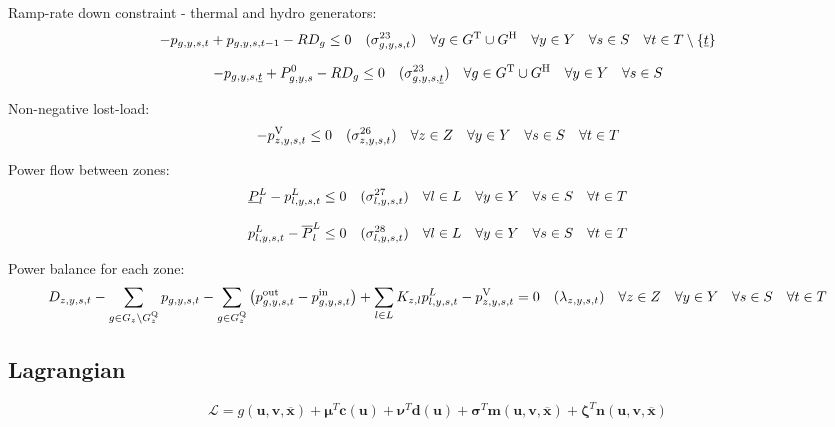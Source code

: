 \documentclass{article}
\newcommand{\sScenarioSets}{\quad \forall \iYear \in \sYears \quad \forall \iScenario \in \sScenarios \quad \forall \iInterval \in \sIntervals}
\begin{document}
Ramp-rate down constraint - thermal and hydro generators:
\begin{equation}
	- \vPower + \vPower[\iGenerator,\iYear,\iScenario,\iInterval-1] - \cRampRateDown \leq 0 \quad (\dRampRateDown) \quad \forall \iGenerator \in \sGeneratorsThermal \cup \sGeneratorsHydro \quad \forall \iYear \in \sYears \quad \forall \iScenario \in \sScenarios \quad \forall \iInterval \in \sIntervals \setminus \{\iIntervalStart\}
\end{equation}

\begin{equation}
- \vPower[\iGenerator,\iYear,\iScenario,\iIntervalStart] + \cPowerInitial - \cRampRateDown \leq 0 \quad (\dRampRateDown[\iGenerator,\iYear,\iScenario,\iIntervalStart]) \quad \forall \iGenerator \in \sGeneratorsThermal \cup \sGeneratorsHydro \quad \forall \iYear \in \sYears \quad \forall \iScenario \in \sScenarios
\end{equation}

Non-negative lost-load:
\begin{equation}
	- \vLostLoadPower \leq 0 \quad (\dNonNegativeLostLoad) \quad \forall \iZone \in \sZones \sScenarioSets
\end{equation}

Power flow between zones:
\begin{equation}
	\cPowerFlowMin - \vPowerFlow \leq 0 \quad (\dMinPowerFlow) \quad \forall \iLink \in \sLinks \sScenarioSets
\end{equation}

\begin{equation}
	\vPowerFlow - \cPowerFlowMax \leq 0 \quad (\dMaxPowerFlow) \quad \forall \iLink \in \sLinks \sScenarioSets
\end{equation}

Power balance for each zone:
\begin{equation}
\cDemand - \sum\limits_{\iGenerator \in \sGenerators_{\iZone} \setminus \sStorage_{\iZone}} \vPower - \sum\limits_{\iGenerator \in \sStorage_{\iZone}} \left(\vPowerOut - \vPowerIn\right) + \sum\limits_{\iLink \in \sLinks} \cIncidenceMatrix \vPowerFlow - \vLostLoadPower = 0 \quad (\dPowerBalance) \quad \forall \iZone \in \sZones \sScenarioSets
\end{equation}

\subsection{Lagrangian}

\begin{equation}
	\mathcal{L} = g(\bm{u}, \bm{v}, \overline{\bm{x}}) + \bm{\mu}^{T}\bm{c}(\bm{u}) + \bm{\nu}^{T}\bm{d}(\bm{u}) + \bm{\sigma}^{T}\bm{m}(\bm{u}, \bm{v}, \bm{\overline{x}}) + \bm{\zeta}^{T} \bm{n}(\bm{u}, \bm{v}, \bm{\overline{x}})
\end{equation}
\end{document}
